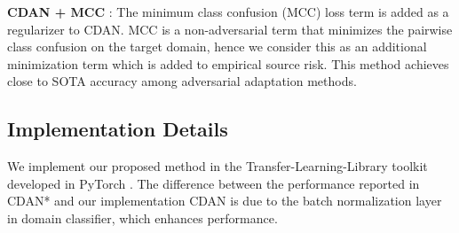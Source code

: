 \documentclass[table,dvipsnames]{article}
\theoremstyle{plain}
\theoremstyle{definition}
\theoremstyle{remark}
\begin{document}
\textbf{CDAN + MCC }\citep{jin2020minimum}: The minimum class confusion (MCC) loss term is added as a regularizer to CDAN. MCC is a non-adversarial term that minimizes the pairwise class confusion on the target domain, hence we consider this as an additional minimization term which is added to empirical source risk. This method achieves close to SOTA accuracy among adversarial adaptation methods. 
\subsection{Implementation Details} \label{imple}
We implement our proposed method in the Transfer-Learning-Library \citep{dalib} toolkit developed in PyTorch \citep{NEURIPS2019_9015}. The difference between the performance reported in CDAN* and our implementation CDAN is due to the batch normalization layer in domain classifier, which enhances performance. 
\end{document}
